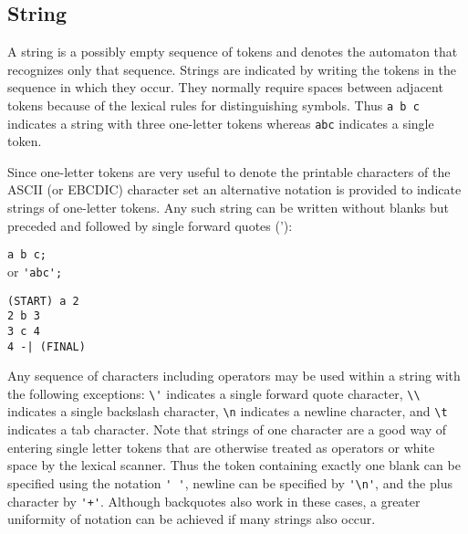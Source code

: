 \subsection{String}
A string is a possibly empty sequence of tokens and denotes the automaton
that recognizes only that sequence.
Strings are indicated by writing the tokens in the sequence in which they
occur.
They normally require spaces between adjacent tokens because of the
lexical rules for distinguishing symbols.
Thus \verb#a b c# indicates a string with three one-letter tokens whereas
\verb#abc# indicates a single token.

Since one-letter tokens are very useful to denote the printable characters
of the ASCII (or EBCDIC) character set an alternative notation is provided
to indicate strings of one-letter tokens.
Any such string can be written without blanks but preceded and followed
by single forward quotes ('):
\begin{center}\begin{minipage}[t]{3in}\begin{minipage}[t]{3in}\begin{tabbing}
\qquad \= \verb#a b c;#\\
or \> \verb#'abc';#
\end{tabbing}\end{minipage}\end{minipage}
\begin{minipage}[t]{1.6in}\begin{verbatim}
(START) a 2
2 b 3
3 c 4
4 -| (FINAL)
\end{verbatim}\end{minipage}\end{center}

Any sequence of characters including operators may be used within a string
with the following exceptions: \verb#\'# indicates a single forward
quote character, \verb#\\# indicates a single backslash character,
\verb#\n# indicates a newline character, and \verb#\t# indicates a tab
character.
Note that strings of one character are a good way of entering single letter
tokens that are otherwise treated as operators or white space by the
lexical scanner.
Thus the token containing exactly one blank can be specified using the
notation \verb#' '#, newline can be specified by \verb#'\n'#, and the plus
character by \verb#'+'#.
Although backquotes also work in these cases, a greater uniformity of
notation can be achieved if many strings also occur.

